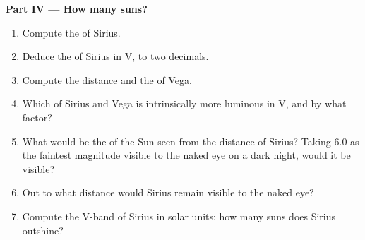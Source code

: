 \begin{problem}
\medskip
\noindent\textbf{Part IV --- How many suns?}
\begin{enumerate}[resume]
  \item Compute the  of Sirius.
  \item Deduce the  of Sirius in V, to two decimals.
  \item Compute the distance and the  of Vega.
  \item Which of Sirius and Vega is intrinsically more luminous in V, and
        by what factor?
  \item What would be the  of the Sun seen from the
        distance of Sirius? Taking 6.0 as the faintest magnitude visible to
        the naked eye on a dark night, would it be visible?
  \item Out to what distance would Sirius remain visible to the naked eye?
  \item Compute the V-band  of Sirius in solar units: how many
        suns does Sirius outshine?
\end{enumerate}
\end{problem}
